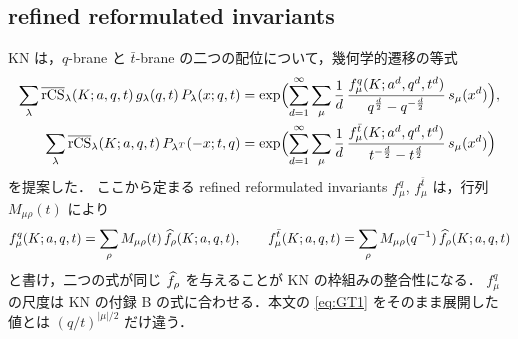 \subsection{refined reformulated invariants}
KN は，$q$-brane と $\bar t$-brane の二つの配位について，幾何学的遷移の等式
\begin{align}
\sum_\lambda \overline{\textrm{rCS}}_\lambda(K;a,q,t)\,g_\lambda(q,t)\,P_\lambda(x;q,t)
&=\exp\Bigl(\sum_{d=1}^\infty\sum_\mu \frac1d\,\frac{f^q_\mu(K;a^d,q^d,t^d)}{q^{\frac d2}-q^{-\frac d2}}\,s_\mu(x^d)\Bigr),\label{eq:GT1}\\
\sum_\lambda \overline{\textrm{rCS}}_\lambda(K;a,q,t)\,P_{\lambda^T}(-x;t,q)
&=\exp\Bigl(\sum_{d=1}^\infty\sum_\mu \frac1d\,\frac{f^{\bar t}_\mu(K;a^d,q^d,t^d)}{t^{-\frac d2}-t^{\frac d2}}\,s_\mu(x^d)\Bigr)\label{eq:GT2}
\end{align}
を提案した．
ここから定まる refined reformulated invariants $f^q_\mu$, $f^{\bar t}_\mu$ は，行列 $M_{\mu\rho}(t)$ により
\begin{equation}\label{eq:f-to-hatf}
f^q_\mu(K;a,q,t)=\sum_\rho M_{\mu\rho}(t)\,\widehat f_\rho(K;a,q,t),\qquad f^{\bar t}_\mu(K;a,q,t)=\sum_\rho M_{\mu\rho}(q^{-1})\,\widehat f_\rho(K;a,q,t)
\end{equation}
と書け，二つの式が同じ $\widehat f_\rho$ を与えることが KN の枠組みの整合性になる．
$f^q_\mu$ の尺度は KN の付録 B の式に合わせる．本文の \eqref{eq:GT1} をそのまま展開した値とは $(q/t)^{|\mu|/2}$ だけ違う．

